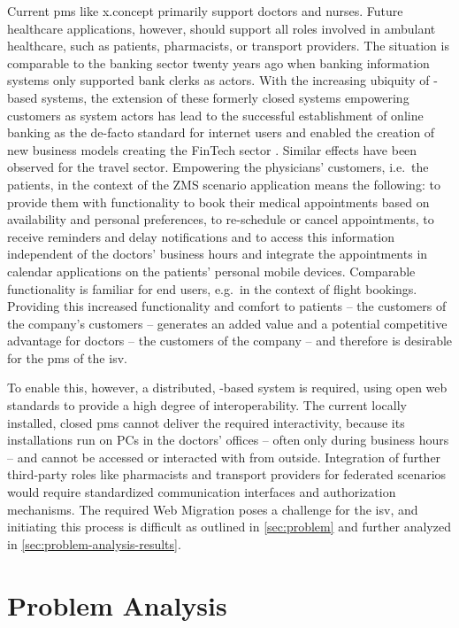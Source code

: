 Current \gls{pms} like x.concept primarily support doctors and nurses.
Future healthcare applications, however, should support all roles involved in ambulant healthcare, such as patients, pharmacists, or transport providers.
The situation is comparable to the banking sector twenty years ago when banking information systems only supported bank clerks as actors.
With the increasing ubiquity of -based systems, the extension of these formerly closed systems empowering customers as system actors has lead to the successful establishment of online banking as the de-facto standard for internet users \autocite{BitkomResearch2016DigitalBanking} and enabled the creation of new business models creating the FinTech sector \autocite{Schueffel2016FinTech}.
Similar effects have been observed for the travel sector.
Empowering the physicians' customers, i.e.~the patients, in the context of the ZMS scenario application means the following: to provide them with functionality to book their medical appointments based on availability and personal preferences, to re-schedule or cancel appointments, to receive reminders and delay notifications and to access this information independent of the doctors' business hours and integrate the appointments in calendar applications on the patients' personal mobile devices.
Comparable functionality is familiar for end users, e.g.~in the context of flight bookings.
Providing this increased functionality and comfort to patients -- the customers of the company's customers -- generates an added value and a potential competitive advantage for doctors -- the customers of the company -- and therefore is desirable for the \gls{pms} of the \gls{isv}.

To enable this, however, a distributed, -based system is required, using open \gls{web} standards to provide a high degree of interoperability.
The current locally installed, closed \gls{pms} cannot deliver the required interactivity, because its installations run on PCs in the doctors' offices -- often only during business hours -- and cannot be accessed or interacted with from outside.
Integration of further third-party roles like pharmacists and transport providers for federated scenarios would require standardized communication interfaces and authorization mechanisms.
The required \gls{Web Migration} poses a challenge for the \gls{isv}, and initiating this process is difficult as outlined in \cref{sec:problem} and further analyzed in \cref{sec:problem-analysis-results}.

\vspace{-15pt}
\hypertarget{sec:problem-analysis}{%
\section{Problem Analysis}\label{sec:problem-analysis}}
\vspace{15pt}

